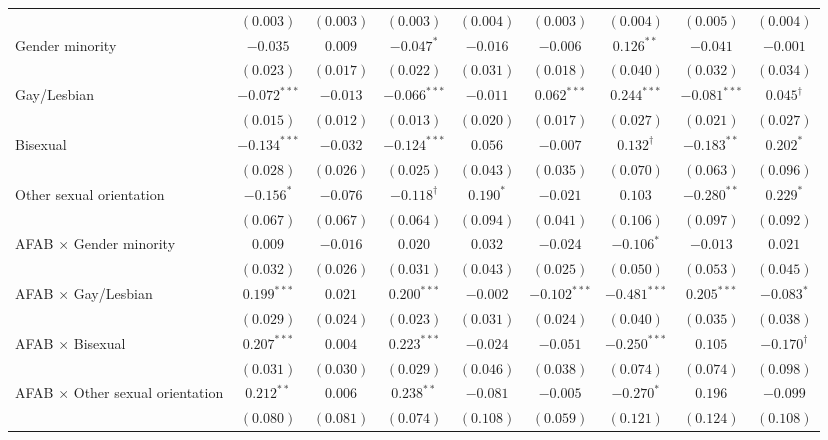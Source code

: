 \begin{table}[htpb]
{\begin{tabular}{l c c c c c c c c}
 & $(0.003)$ & $(0.003)$ & $(0.003)$ & $(0.004)$ & $(0.003)$ & $(0.004)$ & $(0.005)$ & $(0.004)$ \\
Gender minority & $-0.035$ & $0.009$ & $-0.047^{*}$ & $-0.016$ & $-0.006$ & $0.126^{**}$ & $-0.041$ & $-0.001$ \\
 & $(0.023)$ & $(0.017)$ & $(0.022)$ & $(0.031)$ & $(0.018)$ & $(0.040)$ & $(0.032)$ & $(0.034)$ \\
Gay/Lesbian & $-0.072^{***}$ & $-0.013$ & $-0.066^{***}$ & $-0.011$ & $0.062^{***}$ & $0.244^{***}$ & $-0.081^{***}$ & $0.045^{\dagger}$ \\
 & $(0.015)$ & $(0.012)$ & $(0.013)$ & $(0.020)$ & $(0.017)$ & $(0.027)$ & $(0.021)$ & $(0.027)$ \\
Bisexual & $-0.134^{***}$ & $-0.032$ & $-0.124^{***}$ & $0.056$ & $-0.007$ & $0.132^{\dagger}$ & $-0.183^{**}$ & $0.202^{*}$ \\
 & $(0.028)$ & $(0.026)$ & $(0.025)$ & $(0.043)$ & $(0.035)$ & $(0.070)$ & $(0.063)$ & $(0.096)$ \\
Other sexual orientation & $-0.156^{*}$ & $-0.076$ & $-0.118^{\dagger}$ & $0.190^{*}$ & $-0.021$ & $0.103$ & $-0.280^{**}$ & $0.229^{*}$ \\
 & $(0.067)$ & $(0.067)$ & $(0.064)$ & $(0.094)$ & $(0.041)$ & $(0.106)$ & $(0.097)$ & $(0.092)$ \\
AFAB $\times$ Gender minority & $0.009$ & $-0.016$ & $0.020$ & $0.032$ & $-0.024$ & $-0.106^{*}$ & $-0.013$ & $0.021$ \\
 & $(0.032)$ & $(0.026)$ & $(0.031)$ & $(0.043)$ & $(0.025)$ & $(0.050)$ & $(0.053)$ & $(0.045)$ \\
AFAB $\times$ Gay/Lesbian & $0.199^{***}$ & $0.021$ & $0.200^{***}$ & $-0.002$ & $-0.102^{***}$ & $-0.481^{***}$ & $0.205^{***}$ & $-0.083^{*}$ \\
 & $(0.029)$ & $(0.024)$ & $(0.023)$ & $(0.031)$ & $(0.024)$ & $(0.040)$ & $(0.035)$ & $(0.038)$ \\
AFAB $\times$ Bisexual & $0.207^{***}$ & $0.004$ & $0.223^{***}$ & $-0.024$ & $-0.051$ & $-0.250^{***}$ & $0.105$ & $-0.170^{\dagger}$ \\
 & $(0.031)$ & $(0.030)$ & $(0.029)$ & $(0.046)$ & $(0.038)$ & $(0.074)$ & $(0.074)$ & $(0.098)$ \\
AFAB $\times$ Other sexual orientation & $0.212^{**}$ & $0.006$ & $0.238^{**}$ & $-0.081$ & $-0.005$ & $-0.270^{*}$ & $0.196$ & $-0.099$ \\
 & $(0.080)$ & $(0.081)$ & $(0.074)$ & $(0.108)$ & $(0.059)$ & $(0.121)$ & $(0.124)$ & $(0.108)$ \\

\end{tabular}}
\end{table}
